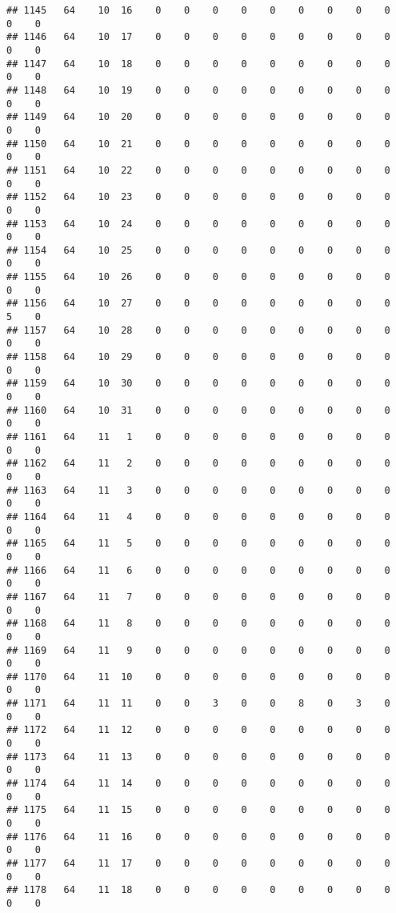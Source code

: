 \documentclass[]{article}
\begin{document}
\begin{verbatim}
## 1145   64    10  16    0    0    0    0    0    0    0    0    0    0    0
## 1146   64    10  17    0    0    0    0    0    0    0    0    0    0    0
## 1147   64    10  18    0    0    0    0    0    0    0    0    0    0    0
## 1148   64    10  19    0    0    0    0    0    0    0    0    0    0    0
## 1149   64    10  20    0    0    0    0    0    0    0    0    0    0    0
## 1150   64    10  21    0    0    0    0    0    0    0    0    0    0    0
## 1151   64    10  22    0    0    0    0    0    0    0    0    0    0    0
## 1152   64    10  23    0    0    0    0    0    0    0    0    0    0    0
## 1153   64    10  24    0    0    0    0    0    0    0    0    0    0    0
## 1154   64    10  25    0    0    0    0    0    0    0    0    0    0    0
## 1155   64    10  26    0    0    0    0    0    0    0    0    0    0    0
## 1156   64    10  27    0    0    0    0    0    0    0    0    0    5    0
## 1157   64    10  28    0    0    0    0    0    0    0    0    0    0    0
## 1158   64    10  29    0    0    0    0    0    0    0    0    0    0    0
## 1159   64    10  30    0    0    0    0    0    0    0    0    0    0    0
## 1160   64    10  31    0    0    0    0    0    0    0    0    0    0    0
## 1161   64    11   1    0    0    0    0    0    0    0    0    0    0    0
## 1162   64    11   2    0    0    0    0    0    0    0    0    0    0    0
## 1163   64    11   3    0    0    0    0    0    0    0    0    0    0    0
## 1164   64    11   4    0    0    0    0    0    0    0    0    0    0    0
## 1165   64    11   5    0    0    0    0    0    0    0    0    0    0    0
## 1166   64    11   6    0    0    0    0    0    0    0    0    0    0    0
## 1167   64    11   7    0    0    0    0    0    0    0    0    0    0    0
## 1168   64    11   8    0    0    0    0    0    0    0    0    0    0    0
## 1169   64    11   9    0    0    0    0    0    0    0    0    0    0    0
## 1170   64    11  10    0    0    0    0    0    0    0    0    0    0    0
## 1171   64    11  11    0    0    3    0    0    8    0    3    0    0    0
## 1172   64    11  12    0    0    0    0    0    0    0    0    0    0    0
## 1173   64    11  13    0    0    0    0    0    0    0    0    0    0    0
## 1174   64    11  14    0    0    0    0    0    0    0    0    0    0    0
## 1175   64    11  15    0    0    0    0    0    0    0    0    0    0    0
## 1176   64    11  16    0    0    0    0    0    0    0    0    0    0    0
## 1177   64    11  17    0    0    0    0    0    0    0    0    0    0    0
## 1178   64    11  18    0    0    0    0    0    0    0    0    0    0    0

\end{verbatim}
\end{document}
